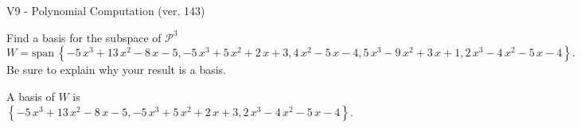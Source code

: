 \begin{exercise}
  \begin{exerciseTitle}V9 - Polynomial Computation (ver. 143)\end{exerciseTitle}
  \begin{exerciseStatement}
    Find a basis for the subspace of \(\mathcal{P}^3\) 
\[W=\mathrm{span}\ \left\{-5 \, x^{3} + 13 \, x^{2} - 8 \, x - 5 , -5 \, x^{3} + 5 \, x^{2} + 2 \, x + 3 , 4 \, x^{2} - 5 \, x - 4 , 5 \, x^{3} - 9 \, x^{2} + 3 \, x + 1 , 2 \, x^{3} - 4 \, x^{2} - 5 \, x - 4\right\}.\]
 Be sure to explain why your result is a basis.


  \end{exerciseStatement}
  \begin{exerciseAnswer}
   A basis of \(W\) is  \(\left\{-5 \, x^{3} + 13 \, x^{2} - 8 \, x - 5 , -5 \, x^{3} + 5 \, x^{2} + 2 \, x + 3 , 2 \, x^{3} - 4 \, x^{2} - 5 \, x - 4\right\}\).
  


  \end{exerciseAnswer}
\end{exercise}